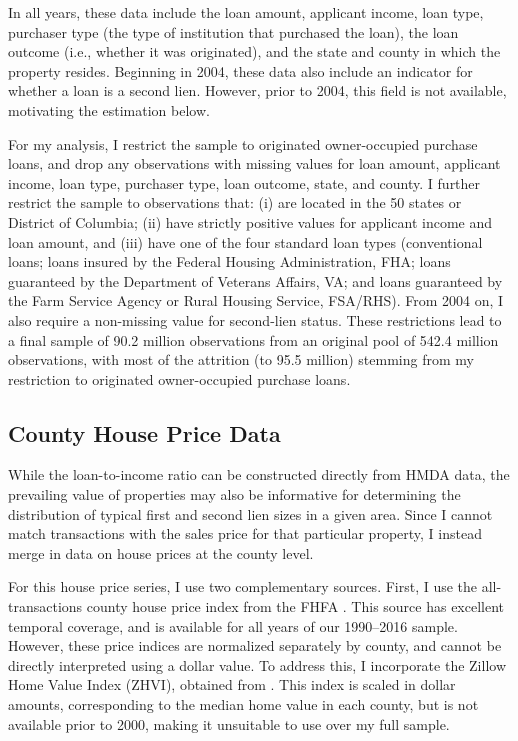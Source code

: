 \documentclass[letterpaper,12pt,usenames,dvipsnames]{article}
\newcommand{\todo}[1]{\ifcomments{\color{red} [#1]}\fi}
\theoremstyle{definition}
\begin{document}

In all years, these data include the loan amount, applicant income, loan type, purchaser type (the type of institution that purchased the loan), the loan outcome (i.e., whether it was originated), and the state and county in which the property resides. Beginning in 2004, these data also include an indicator for whether a loan is a second lien. However, prior to 2004, this field is not available, motivating the estimation below.

For my analysis, I restrict the sample to originated owner-occupied purchase loans, and drop any observations with missing values for loan amount, applicant income, loan type, purchaser type, loan outcome, state, and county. I further restrict the sample to observations that: (i) are located in the 50 states or District of Columbia; (ii) have strictly positive values for applicant income and loan amount, and (iii) have one of the four standard loan types (conventional loans; loans insured by the Federal Housing Administration, FHA; loans guaranteed by the Department of Veterans Affairs, VA; and loans guaranteed by the Farm Service Agency or Rural Housing Service, FSA/RHS). From 2004 on, I also require a non-missing value for second-lien status. These restrictions lead to a final sample of 90.2 million observations from an original pool of 542.4 million observations, with most of the attrition (to 95.5 million) stemming from my restriction to originated owner-occupied purchase loans.

\subsection{County House Price Data}\label{sec:fhfa-data}

While the loan-to-income ratio can be constructed directly from HMDA data, the prevailing value of properties may also be informative for determining the distribution of typical first and second lien sizes in a given area. Since I cannot match transactions with the sales price for that particular property, I instead merge in data on house prices at the county level.

For this house price series, I use two complementary sources. First, I use the all-transactions county house price index from the FHFA \citep{bogin2019local,fhfa2026county}. This source has excellent temporal coverage, and is available for all years of our 1990--2016 sample. However, these price indices are normalized separately by county, and cannot be directly interpreted using a dollar value. To address this, I incorporate the Zillow Home Value Index (ZHVI), obtained from \cite{zillow2026zhvi}. This index is scaled in dollar amounts, corresponding to the median home value in each county, but is not available prior to 2000, making it unsuitable to use over my full sample.
\end{document}

